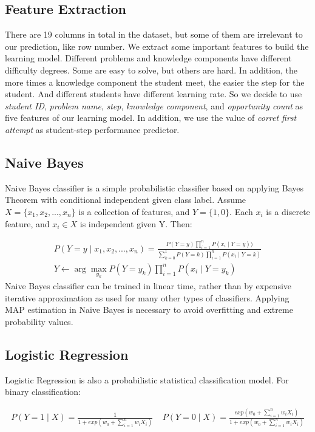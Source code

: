 \documentclass{article} %
\begin{document}
\subsection{Feature Extraction}
There are 19 columns in total in the dataset, but some of them are irrelevant to our prediction, like row number. We extract some important features to build the learning model. Different problems and knowledge components have different difficulty degrees. Some are easy to solve, but others are hard. In addition, the more times a knowledge component the student meet, the easier the step for the student. And different students have different learning rate. So we decide to use \emph{student ID}, \emph{problem name}, \emph{step}, \emph{knowledge component}, and \emph{opportunity count}  as five features of our learning model. In addition, we use the value of \emph{corret first attempt} as student-step performance predictor.

\subsection{Naive Bayes}
Naive Bayes classifier is a simple probabilistic classifier based on applying Bayes Theorem with conditional independent given class label. Assume $X=\{ x_1, x_2,..., x_n\}$ is a collection of features, and $Y=\{1,0\}$. Each $x_i$ is a discrete feature, and $x_i\in X$ is independent given Y. Then: 

\begin{equation}
\begin{aligned}
P(Y=y \mid x_1, x_2,..., x_n)=\frac{P(Y=y) \prod_{i=1}^{n} P(x_i \mid Y=y))}{\sum_{k=0}^{1} P(Y=k)\prod_{i=1}^{n} P(x_i \mid Y=k)}\\
Y\leftarrow \arg\max_{y_k} P(Y=y_k) \prod_{i=1}^{n} P(x_i \mid Y=y_k) 
\end{aligned}
\end{equation}
Naive Bayes classifier can be trained in linear time, rather than by expensive iterative approximation as used for many other types of classifiers. Applying MAP estimation in Naive Bayes is necessary to avoid overfitting and extreme probability values. 

\subsection{Logistic Regression}
Logistic Regression is also a probabilistic statistical classification model. For binary classification: 

\begin{equation}
\begin{aligned}
P(Y=1\mid X)=\frac{1}{1+exp(w_0+\sum_{i=1}^{n} w_iX_i)} ~~~~~ P(Y=0\mid X)=\frac{exp(w_0+\sum_{i=1}^{n} w_iX_i)}{1+exp(w_0+\sum_{i=1}^{n} w_iX_i)} 
\end{aligned}
\end{equation}
\end{document}
